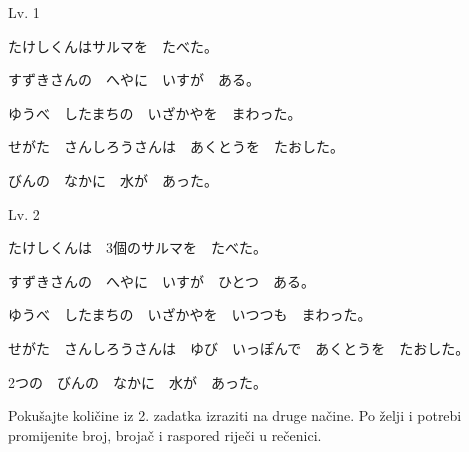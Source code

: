 
\author{Tomislav Mamić}

	
	\begin{mondai}{Lv. 1}
		\item たけしくんはサルマを　たべた。
		\item すずきさんの　へやに　いすが　ある。
		\item ゆうべ　したまちの　いざかやを　まわった。
		\item せがた　さんしろうさん\footnotemark[1]は　あくとうを　たおした。
		\item びんの　なかに　水が　あった。
	\end{mondai}


	\begin{mondai}{Lv. 2}
		\item たけしくんは　3個のサルマを　たべた。
		\item すずきさんの　へやに　いすが　ひとつ　ある。
		\item ゆうべ　したまちの　いざかやを　いつつも\footnotemark[2]　まわった。
		\item せがた　さんしろうさんは　ゆび　いっぽんで　あくとうを　たおした。
		\item 2つの　びんの　なかに　水が　あった。
	\end{mondai}

	\noindent
	Pokušajte količine iz 2. zadatka izraziti na druge načine. Po želji i potrebi promijenite broj, brojač i raspored riječi u rečenici.

